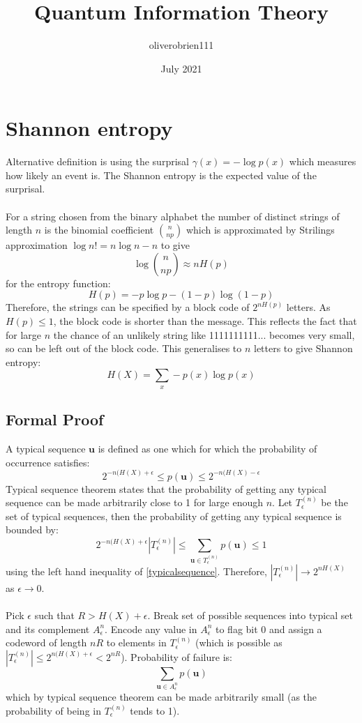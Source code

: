 \documentclass{article}
\title{Quantum Information Theory}
\author{oliverobrien111 }
\date{July 2021}
\begin{document}
\maketitle

\section{Shannon entropy}
Alternative definition is using the surprisal $\gamma(x) = -\log p(x)$ which measures how likely an event is. The Shannon entropy is the expected value of the surprisal.\\\\
For a string chosen from the binary alphabet the number of distinct strings of length $n$ is the binomial coefficient ${n \choose np}$ which is approximated by Strilings approximation $\log n! = n\log n - n$ to give
$$
\log {n \choose np} \approx nH(p)
$$
for the entropy function:
\begin{equation}
    H(p) = -p\log p - (1-p) \log (1-p)
\end{equation}
Therefore, the strings can be specified by a block code of $2^{nH(p)}$ letters. As $H(p) \leq 1$, the block code is shorter than the message. This reflects the fact that for large $n$ the chance of an unlikely string like 1111111111... becomes very small, so can be left out of the block code. This generalises to $n$ letters to give Shannon entropy:
\begin{equation}
    H(X) = \sum_x -p(x)\log p(x)
\end{equation}
\subsection{Formal Proof}
A typical sequence $\bm u$ is defined as one which for which the probability of occurrence satisfies:
\begin{equation}
2^{-n(H(X)+\epsilon}\leq p(\bm u) \leq2^{-n(H(X)-\epsilon}
\label{typicalsequence}
\end{equation}
Typical sequence theorem states that the probability of getting any typical sequence can be made arbitrarily close to 1 for large enough $n$. Let $T_{\epsilon}^{(n)}$ be the set of typical sequences, then the probability of getting any typical sequence is bounded by:
$$ 2^{-n(H(X)+\epsilon}|T_{\epsilon}^{(n)}| \leq
\sum_{\bm u \in T_{\epsilon}^{(n)}} p(\bm u) \leq 1
$$
using the left hand inequality of \ref{typicalsequence}. Therefore, $|T_{\epsilon}^{(n)}| \rightarrow 2^{n H(X)}$ as $\epsilon \rightarrow 0$.\\\\
Pick $\epsilon$ such that $R> H(X) + \epsilon$. Break set of possible sequences into typical set and its complement $A^{n}_{\epsilon}$. Encode any value in $A^{n}_{\epsilon}$ to flag bit $0$ and assign a codeword of length $n R$ to elements in $T_{\epsilon}^{(n)}$ (which is possible as  $|T_{\epsilon}^{(n)}| \leq 2^{n(H(X)+\epsilon} < 2^{n R}$). Probability of failure is:
\begin{equation}
    \sum_{\bm u \in A^{n}_{\epsilon}}p(\bm u)
\end{equation}
which by typical sequence theorem can be made arbitrarily small (as the probability of being in  $T_{\epsilon}^{(n)}$ tends to 1).
\end{document}
